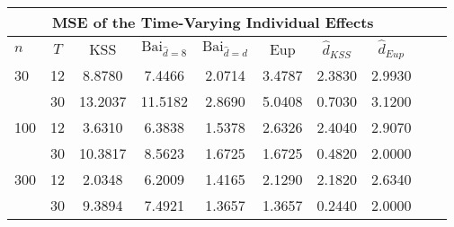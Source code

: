 \begin{tabular}{lccccccccc} 
\hline \multicolumn{8}{c}{MSE of the Time-Varying Individual Effects} \\ \hline 
$n$ & $T$ & KSS & $ \text{Bai}_{\hat{d} = 8}$ & $\text{Bai}_{\hat{d} = d}$ & Eup & $\hat{d}_{KSS}$ & $\hat{d}_{Eup}$ \\
\hline
30 & 12 &  8.8780  &  7.4466  &  2.0714  &  3.4787  &  2.3830  &  2.9930  \\
& 30 &  13.2037  &  11.5182  &  2.8690  &  5.0408  &  0.7030  &  3.1200  \\
100 & 12 &  3.6310  &  6.3838  &  1.5378  &  2.6326  &  2.4040  &  2.9070  \\
& 30 &  10.3817  &  8.5623  &  1.6725  &  1.6725  &  0.4820  &  2.0000  \\
300 & 12 &  2.0348  &  6.2009  &  1.4165  &  2.1290  &  2.1820  &  2.6340  \\
& 30 &  9.3894  &  7.4921  &  1.3657  &  1.3657  &  0.2440  &  2.0000  \\
\end{tabular} 

